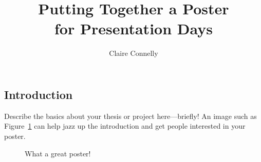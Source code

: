 \documentclass[thesis]{hmcposter}
\author{Claire Connelly}
\title{Putting Together a Poster\\for Presentation Days}
\begin{document}
\begin{poster}

\section{Introduction}

Describe the basics about your thesis or project here---briefly!  An
image such as Figure~\ref{fig:our-poster} can help jazz up the
introduction and get people interested in your poster.

\begin{figure}
\begin{center}
\caption{What a great poster!}%
\label{fig:our-poster}
\end{center}
\end{figure}


\end{poster}
\end{document}
